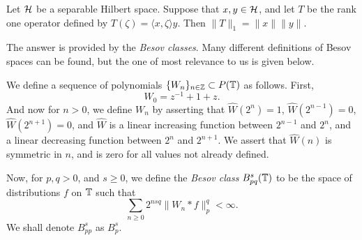 \documentclass{unswmaths}
\begin{document}
\begin{lemma}
    Let $\mathcal{H}$ be a separable Hilbert space. Suppose
    that $x,y \in \mathcal{H}$, and let $T$ be the rank one operator
    defined by $T(\zeta) = \langle x,\zeta\rangle y$. Then $\|T\|_1 = \|x\|\|y\|$.
\end{lemma}

The answer is provided by the \emph{Besov classes}. Many different definitions
of Besov spaces can be found, but the one of most relevance to us is given below.
\begin{definition}
    We define a sequence of polynomials $\{W_n\}_{n \in \mathbb{Z}} \subset P(\mathbb{T})$ as follows.
    First,
    \begin{equation*}
        W_0 = z^{-1}+1+z.
    \end{equation*}
    And now for $n > 0$, we define $W_n$ by asserting that $\widehat{W}(2^n) = 1$,
    $\widehat{W}(2^{n-1}) = 0$, $\widehat{W}(2^{n+1}) = 0$, and $\widehat{W}$
    is a linear increasing function between $2^{n-1}$ and $2^n$, and a
    linear decreasing function between $2^n$ and $2^{n+1}$. We
    assert that $\widehat{W}(n)$ is symmetric in $n$, and is zero for all
    values not already defined.
    
    Now, for $p,q > 0$, and $s \geq 0$, we define the \emph{Besov class}
    $B_{pq}^s(\mathbb{T})$ to be the space of distributions $f$ on $\mathbb{T}$ such that
    \begin{equation*}
        \sum_{n\geq 0} 2^{nsq} \|W_n*f\|_{p}^q < \infty.
    \end{equation*}  
    We shall denote $B_{pp}^s$ as $B_p^s$.
\end{definition}
\end{document}
